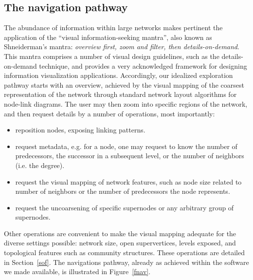 \documentclass[runningheads]{llncs}
\begin{document}
\subsection{The navigation pathway}\label{nav}
The abundance of information within large networks makes pertinent the
application of
the ``visual information-seeking mantra'', also known as Shneiderman's mantra:
\emph{overview first, zoom and filter, then details-on-demand}.
This mantra comprises a number of visual design guidelines,
such as the details-on-demand technique, and provides
a very acknowledged framework for designing information visualization applications.
Accordingly, our idealized exploration pathway starts with an overview,
achieved by the visual mapping of the coarsest representation of the network through
standard network layout algorithms for node-link diagrams.
The user may then zoom into specific regions of the network, and then request
details by a number of operations, most importantly:
\begin{itemize}
  \item reposition nodes, exposing linking patterns.
  \item request metadata, e.g. for a node, one may request to know the number of predecessors,
    the successor in a subsequent level, or the number of neighbors (i.e. the degree).
  \item request the visual mapping of network features, such as node size related to number of neighbors or the number of predecessors the node represents.
  \item request the uncoarsening of specific supernodes or any arbitrary group of supernodes.
\end{itemize}

Other operations are convenient to make the visual mapping adequate for the diverse settings possible:
network size, open supervertices, levels exposed, and topological features such as community structures.
These operations are detailed in Section~\ref{sof}.
The navigations pathway, already as achieved within the software we made available, is illustrated in Figure~\ref{fnav}.
\end{document}
